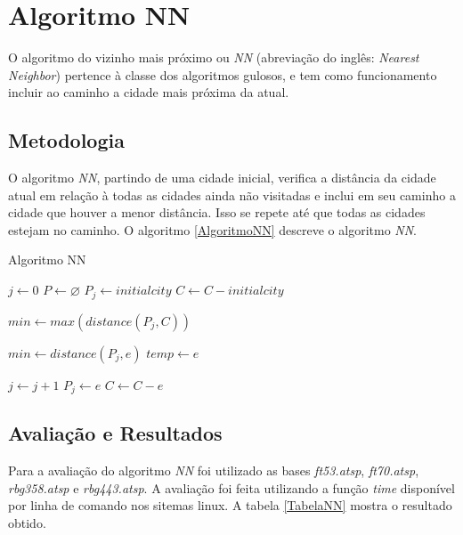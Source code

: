 \documentclass[a4paper,12pt]{article}
\begin{document}
\section{Algoritmo NN}
O algoritmo do vizinho mais próximo ou \emph{NN} (abreviação do inglês: \textit{Nearest Neighbor}) pertence à 
classe dos algoritmos gulosos, e tem como funcionamento incluir ao caminho a cidade mais próxima da atual. 


\subsection{Metodologia}
O algoritmo \emph{NN}, partindo de uma cidade inicial, verifica a distância da cidade atual em relação à todas as 
cidades ainda não visitadas e inclui em seu caminho a cidade que houver a menor distância. Isso se repete até que 
todas as cidades estejam no caminho.
O algoritmo \ref{AlgoritmoNN} descreve o algoritmo \emph{NN}.

\begin{algorithm}[H]
\caption{Algoritmo NN} \label{AlgoritmoNN}
\begin{algorithmic}[1]

\State $j \gets 0$
\State $P \gets \varnothing$
\State $P_j \gets initial city$
\State $C \gets C - initial city$


\State $min \gets \textit{max}(\textit{distance}(P_j, C))$


\State $min \gets \textit{distance}(P_j, e)$
\State $temp \gets e$
\EndIf
\EndFor

\State $j \gets j + 1$
\State $P_j \gets e$
\State $C \gets C - e$

\EndWhile
\EndProcedure

\end{algorithmic}
\end{algorithm}


\subsection{Avaliação e Resultados}
Para a avaliação do algoritmo \emph{NN} foi utilizado as bases \emph{ft53.atsp}, \emph{ft70.atsp}, \emph{rbg358.atsp} e \emph{rbg443.atsp}.
A avaliação foi feita utilizando a função \emph{time} disponível por linha de comando nos sitemas linux.
A tabela \ref{TabelaNN} mostra o resultado obtido.
\end{document}
